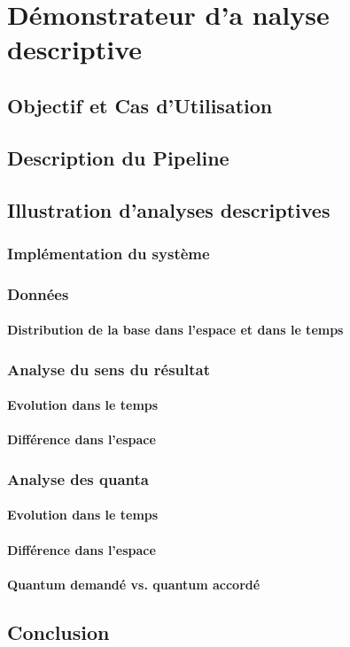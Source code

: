\chapter{Démonstrateur d'a
	nalyse descriptive}
\label{chap:demo}

\section{Objectif et Cas d'Utilisation}
\label{sec:demo:objectif}

\section{Description du Pipeline}
\label{sec:demo:motivation}

\section{Illustration d'analyses descriptives}
\label{sec:demo:experimentations}

\subsection{Implémentation du système}

\subsection{Données}
\subsubsection{Distribution de la base dans l'espace et dans le temps}

\subsection{Analyse du sens du résultat}
\subsubsection{Evolution dans le temps}
\subsubsection{Différence dans l'espace}

\subsection{Analyse des quanta}
\subsubsection{Evolution dans le temps}
\subsubsection{Différence dans l'espace}
\subsubsection{Quantum demandé vs. quantum accordé}

\section{Conclusion}
\label{sec:demo:conclusion}